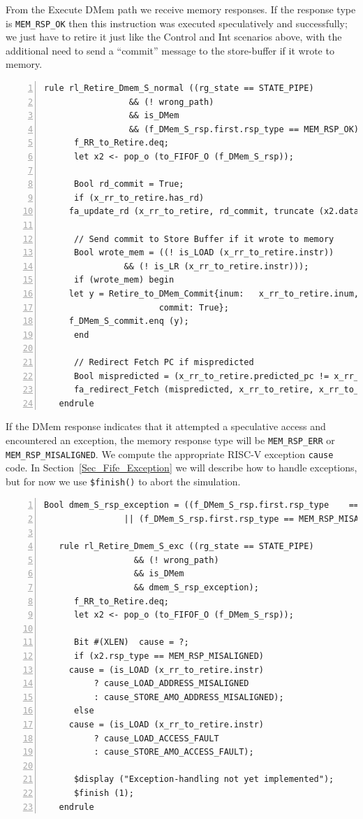 From the Execute DMem path we receive memory responses.  If the
response type is \verb|MEM_RSP_OK| then this instruction was executed
speculatively and successfully; we just have to retire it just like
the Control and Int scenarios above, with the additional need to send
a ``commit'' message to the store-buffer if it wrote to memory.

{\small
\begin{Verbatim}[frame=single, numbers=left, label=(In file:src\_Fife/S5\_Retire.bsv)]
   rule rl_Retire_Dmem_S_normal ((rg_state == STATE_PIPE)
				 && (! wrong_path)
				 && is_DMem
				 && (f_DMem_S_rsp.first.rsp_type == MEM_RSP_OK));
      f_RR_to_Retire.deq;
      let x2 <- pop_o (to_FIFOF_O (f_DMem_S_rsp));

      Bool rd_commit = True;
      if (x_rr_to_retire.has_rd)
	 fa_update_rd (x_rr_to_retire, rd_commit, truncate (x2.data));

      // Send commit to Store Buffer if it wrote to memory
      Bool wrote_mem = ((! is_LOAD (x_rr_to_retire.instr))
		        && (! is_LR (x_rr_to_retire.instr)));
      if (wrote_mem) begin
	 let y = Retire_to_DMem_Commit{inum:   x_rr_to_retire.inum,
				       commit: True};
	 f_DMem_S_commit.enq (y);
      end

      // Redirect Fetch PC if mispredicted
      Bool mispredicted = (x_rr_to_retire.predicted_pc != x_rr_to_retire.fallthru_pc);
      fa_redirect_Fetch (mispredicted, x_rr_to_retire, x_rr_to_retire.fallthru_pc);
   endrule
\end{Verbatim}
}

If the DMem response indicates that it attempted a speculative access
and encountered an exception, the memory response type will be
\verb|MEM_RSP_ERR| or \verb|MEM_RSP_MISALIGNED|.  We compute the
appropriate RISC-V exception \verb|cause| code.  In
Section~\ref{Sec_Fife_Exception} we will describe how to handle
exceptions, but for now we use \verb|$finish()| to abort the
simulation.

{\small
\begin{Verbatim}[frame=single, numbers=left, label=(In file:src\_Fife/S5\_Retire.bsv)]
   Bool dmem_S_rsp_exception = ((f_DMem_S_rsp.first.rsp_type    == MEM_RSP_ERR)
				|| (f_DMem_S_rsp.first.rsp_type == MEM_RSP_MISALIGNED));

   rule rl_Retire_Dmem_S_exc ((rg_state == STATE_PIPE)
			      && (! wrong_path)
			      && is_DMem
			      && dmem_S_rsp_exception);
      f_RR_to_Retire.deq;
      let x2 <- pop_o (to_FIFOF_O (f_DMem_S_rsp));

      Bit #(XLEN)  cause = ?;
      if (x2.rsp_type == MEM_RSP_MISALIGNED)
	 cause = (is_LOAD (x_rr_to_retire.instr)
		  ? cause_LOAD_ADDRESS_MISALIGNED
		  : cause_STORE_AMO_ADDRESS_MISALIGNED);
      else
	 cause = (is_LOAD (x_rr_to_retire.instr)
		  ? cause_LOAD_ACCESS_FAULT
		  : cause_STORE_AMO_ACCESS_FAULT);

      $display ("Exception-handling not yet implemented");
      $finish (1);
   endrule
\end{Verbatim}
}

